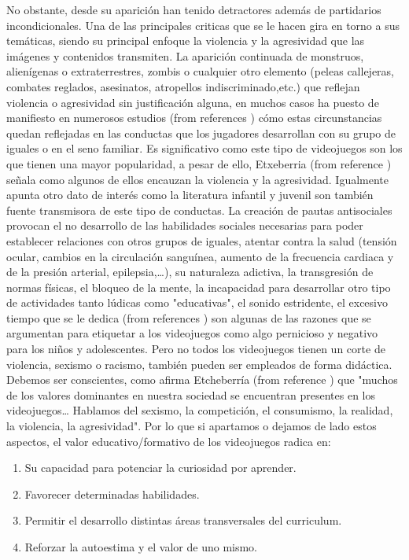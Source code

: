 \documentclass{bmcart}
\begin{document}
No obstante, desde su aparición han tenido detractores además de partidarios incondicionales. Una de las principales criticas que se le hacen gira en torno a sus temáticas, siendo su principal enfoque la violencia y la agresividad que las imágenes y contenidos transmiten. La aparición continuada de monstruos, alienígenas o extraterrestres, zombis o cualquier otro elemento (peleas callejeras, combates reglados, asesinatos, atropellos indiscriminado,etc.) que reflejan violencia o agresividad sin justificación alguna, en muchos casos ha puesto de manifiesto en numerosos estudios (from references \cite{anderson2000video} \cite{kirsh2003effects}) cómo estas circunstancias quedan reflejadas en las conductas que los jugadores desarrollan con su grupo de iguales o en el seno familiar. Es significativo como este tipo de videojuegos son los que tienen una mayor popularidad, a pesar de ello, Etxeberria (from reference \cite{etche}) señala como algunos de ellos encauzan la violencia y la agresividad. Igualmente apunta otro dato de interés como la literatura infantil y juvenil son también fuente transmisora de este tipo de conductas.
\newline
\newline
La creación de pautas antisociales provocan el no desarrollo de las habilidades sociales necesarias para poder establecer relaciones con otros grupos de iguales, atentar contra la salud (tensión ocular, cambios en la circulación sanguínea, aumento de la frecuencia cardiaca y de la presión arterial, epilepsia,…), su naturaleza adictiva, la transgresión de normas físicas, el bloqueo de la mente, la incapacidad para desarrollar otro tipo de actividades tanto lúdicas como "educativas", el sonido estridente, el excesivo tiempo que se le dedica (from references\cite{GRECTPPR-022840} \cite{salvat2002nuevos} \cite{rana2003microciberjuegos}) son algunas de las razones que se argumentan para etiquetar a los videojuegos como algo pernicioso y negativo para los niños y adolescentes.
\newline
\newline
Pero no todos los videojuegos tienen un corte de violencia, sexismo o racismo, también pueden ser empleados de forma didáctica. Debemos ser conscientes, como afirma Etcheberría (from reference \cite{etche}) que "muchos de los valores dominantes en nuestra sociedad se encuentran presentes en los videojuegos… Hablamos del sexismo, la competición, el consumismo, la realidad, la violencia, la agresividad". Por lo que si apartamos o dejamos de lado estos aspectos, el valor educativo/formativo de los videojuegos radica en:
\newline
\begin{enumerate}
	\item Su capacidad para potenciar la curiosidad por aprender.
	\item Favorecer determinadas habilidades.
	\item Permitir el desarrollo distintas áreas transversales del curriculum.
	\item Reforzar la autoestima y el valor de uno mismo.
\end{enumerate}
\end{document}
